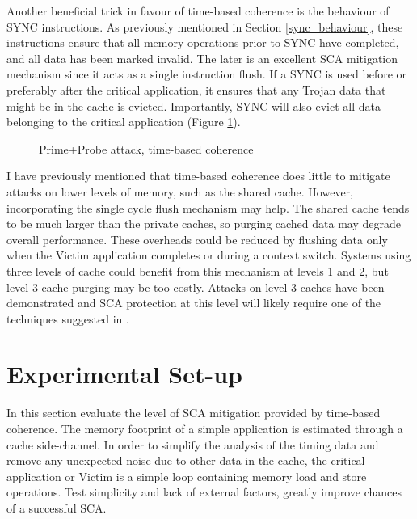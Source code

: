 			Another beneficial trick in favour of time-based coherence is the behaviour of SYNC instructions. As previously mentioned in Section \ref{sync_behaviour}, these instructions ensure that all memory operations prior to SYNC have completed, and all data has been marked invalid. The later is an excellent SCA mitigation mechanism since it acts as a single instruction flush. If a SYNC is used before or preferably after the critical application, it ensures that any Trojan data that might be in the cache is evicted. Importantly, SYNC will also evict all data belonging to the critical application (Figure \ref{prime_and_probe_time_based}). 
			
			\begin{figure}[t]
			\centering 
				\caption{Prime+Probe attack, time-based coherence} 
				\label{prime_and_probe_time_based}
			\end{figure}
			
			I have previously mentioned that time-based coherence does little to mitigate attacks on lower levels of memory, such as the shared cache. However, incorporating the single cycle flush mechanism may help. The shared cache tends to be much larger than the private caches, so purging cached data may degrade overall performance. These overheads could be reduced by flushing data only when the Victim application completes or during a context switch. Systems using three levels of cache could benefit from this mechanism at levels 1 and 2, but level 3 cache purging may be too costly. Attacks on level 3 caches have been demonstrated and SCA protection at this level will likely require one of the techniques suggested in \cite{Irazoqui15,Yarom14,Hund13,Brumley11}.
	
	\section{Experimental Set-up}
		In this section evaluate the level of SCA mitigation provided by time-based coherence. The memory footprint of a simple application is estimated through a cache side-channel. In order to simplify the analysis of the timing data and remove any unexpected noise due to other data in the cache, the  critical application or Victim is a simple loop containing memory load and store operations. Test simplicity and lack of external factors, greatly improve chances of a successful SCA. 
		
